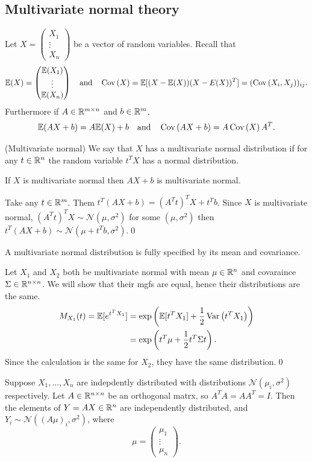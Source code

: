 \documentclass{article}
\begin{document}
\subsection{Multivariate normal theory}
Let $ X = \begin{pmatrix}
   X_1 \\
   \vdots \\
   X_n 
\end{pmatrix} $ be a vector of random variables. Recall that
\[
  \mathbb E(X) = \begin{pmatrix}
    \mathbb E(X_1) \\
    \vdots \\
    \mathbb E(X_n)
\end{pmatrix}\quad \text{and}\quad \operatorname{Cov}\left({X}\right) = \mathbb E[(X-\mathbb E(X))(X-E(X))^T]=(\operatorname{Cov}\left({X_i,X_j}\right))_{ij}.
\]
Furthermore if $ A\in \mathbb{R}^{m\times n} $ and $ b\in \mathbb{R}^m $,
\[
	\mathbb E(AX+b) = A\mathbb E(X) + b\quad \text{and} \quad \operatorname{Cov}\left({AX+b}\right) = A\operatorname{Cov}\left({X}\right)A^T.
\]
\begin{definition}
	(Multivariate normal) We say that $ X $ has a multivariate normal distribution if for any $ t\in \mathbb{R}^n $ the random variable $ t^TX $ has a normal distribution.
\end{definition}
\begin{proposition}
  If $ X $ is multivariate normal then $ AX+b $ is multivariate normal.
\end{proposition}
\pf Take any $ t\in \mathbb{R}^m $. Them $ t^T(AX+b) = (A^T t)^TX + t^Tb $. Since $ X $ is multivariate normal, $ (A^Tt)^TX \sim\mathcal N(\mu,\sigma^2) $ for some $ (\mu,\sigma^2) $ then $ t^T(AX+b) \sim \mathcal N(\mu+t^Tb,\sigma^2) $.\qed
\begin{proposition}
  A multivariate normal distribution is fully specified by its mean and covariance.
\end{proposition}
\pf Let $ X_1 $ and $ X_2 $ both be multivariate normal with mean $ \mu\in \mathbb{R}^n $ and covaraince $ \Sigma\in \mathbb{R}^{n\times n } $. We will show that their mgfs are equal, hence their distributions are the same.
\begin{align*}
	M_{X_1}(t) = \mathbb E[e^{t^TX_1}] &= \exp\left(\mathbb E[t^TX_1] + \frac 12 \operatorname{Var}\left({t^TX_1}\right)\right)\\
					   &=\exp\left(t^T\mu + \frac 12 t^T \Sigma t\right).
\end{align*}
Since the calculation is the same for $ X_2 $, they have the same distribution.\qed
\begin{corollary}
	Suppose $ X_1,\dots, X_n $ are indepdently distributed with distributions $ \mathcal N(\mu_i,\sigma^2) $ respectively. Let $ A\in \mathbb{R}^{n\times n} $ be an orthogonal matrx, so $ A^TA=AA^T = I $. Then the elements of $ Y=AX\in \mathbb{R}^n $ are independently distributed, and $ Y_i\sim\mathcal N((A\mu)_i,\sigma^2) $, where \[\mu=\begin{pmatrix}
	  \mu_1 \\
	  \vdots \\
	  \mu_n
  \end{pmatrix}. \]
\end{corollary}
\end{document}
